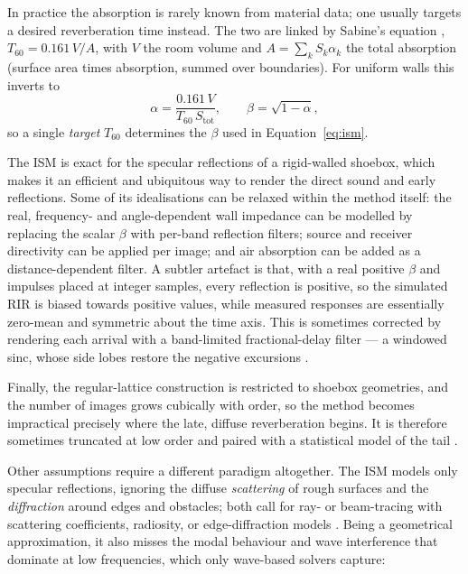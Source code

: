 In practice the absorption is rarely known from material data; one usually
targets a desired reverberation time instead. The two are linked by
Sabine's equation \citep{sabine2015collected}, $T_{60} = 0.161\,V/A$, with $V$ the room volume and
$A=\sum_k S_k \alpha_k$ the total absorption (surface area times absorption,
summed over boundaries). For uniform walls this inverts to
\begin{equation}
    \alpha = \frac{0.161\,V}{T_{60}\,S_\mathrm{tot}}, \qquad
    \beta=\sqrt{1-\alpha},
    \label{eq:sabine}
\end{equation}
so a single \emph{target} $T_{60}$ determines the $\beta$ used in
Equation~\ref{eq:ism}.

The \acrshort{ISM} is exact for the
specular reflections of a rigid-walled shoebox, which makes it an efficient
and ubiquitous way to render the direct sound and early reflections. Some of
its idealisations can be relaxed within the method itself: the real,
frequency- and angle-dependent wall impedance can be modelled by replacing
the scalar $\beta$ with per-band reflection filters; source and receiver
directivity can be applied per
image; and air absorption can be added as a distance-dependent filter. A
subtler artefact is that, with a real positive $\beta$ and impulses placed
at integer samples, every reflection is positive, so the simulated
\acrshort{RIR} is biased towards positive values, while measured
responses are essentially zero-mean and symmetric about the time axis. This
is sometimes corrected by rendering each arrival with a band-limited fractional-delay
filter --- a windowed sinc, whose side lobes restore the negative
excursions \citep{peterson1986simulating}.

Finally, the regular-lattice construction is restricted to shoebox
geometries, and the number of images grows cubically with order, so the
method becomes impractical precisely where the late, diffuse reverberation
begins. It is therefore sometimes truncated at low order and paired with a
statistical model of the tail \citep{lehmann2009diffuse}.

Other assumptions require a different paradigm altogether. The
\acrshort{ISM} models only specular reflections, ignoring the diffuse
\emph{scattering} of rough surfaces and the \emph{diffraction} around edges
and obstacles; both call for ray- or beam-tracing with scattering
coefficients, radiosity, or edge-diffraction models \citep{savioja2015overview}. Being a geometrical approximation, it also misses the modal behaviour and wave
interference that dominate at low frequencies, which only wave-based solvers
capture:

